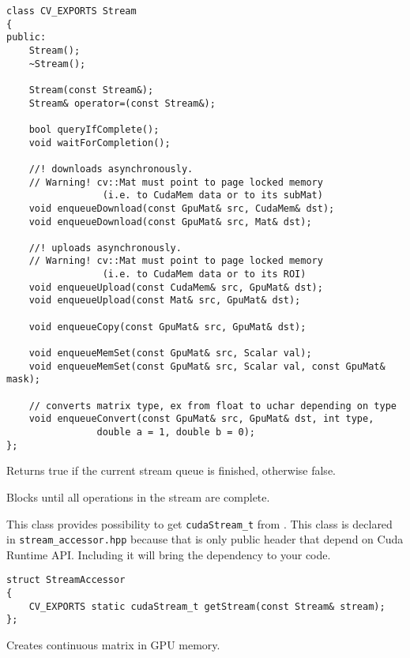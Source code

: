 \begin{lstlisting}
class CV_EXPORTS Stream
{
public:
	Stream();
	~Stream();

	Stream(const Stream&);
	Stream& operator=(const Stream&);

	bool queryIfComplete();
	void waitForCompletion();

	//! downloads asynchronously.
	// Warning! cv::Mat must point to page locked memory
                 (i.e. to CudaMem data or to its subMat)
	void enqueueDownload(const GpuMat& src, CudaMem& dst);
	void enqueueDownload(const GpuMat& src, Mat& dst);

	//! uploads asynchronously.
	// Warning! cv::Mat must point to page locked memory 
                 (i.e. to CudaMem data or to its ROI)
	void enqueueUpload(const CudaMem& src, GpuMat& dst);
	void enqueueUpload(const Mat& src, GpuMat& dst);

	void enqueueCopy(const GpuMat& src, GpuMat& dst);

	void enqueueMemSet(const GpuMat& src, Scalar val);
	void enqueueMemSet(const GpuMat& src, Scalar val, const GpuMat& mask);

	// converts matrix type, ex from float to uchar depending on type
	void enqueueConvert(const GpuMat& src, GpuMat& dst, int type, 
                double a = 1, double b = 0);
};

\end{lstlisting}

Returns true if the current stream queue is finished, otherwise false.

Blocks until all operations in the stream are complete.



This class provides possibility to get \texttt{cudaStream\_t} from . This class is declared in \texttt{stream\_accessor.hpp} because that is only public header that depend on Cuda Runtime API. Including it will bring the dependency to your code.

\begin{lstlisting}
struct StreamAccessor
{
	CV_EXPORTS static cudaStream_t getStream(const Stream& stream);
};
\end{lstlisting}

Creates continuous matrix in GPU memory.

